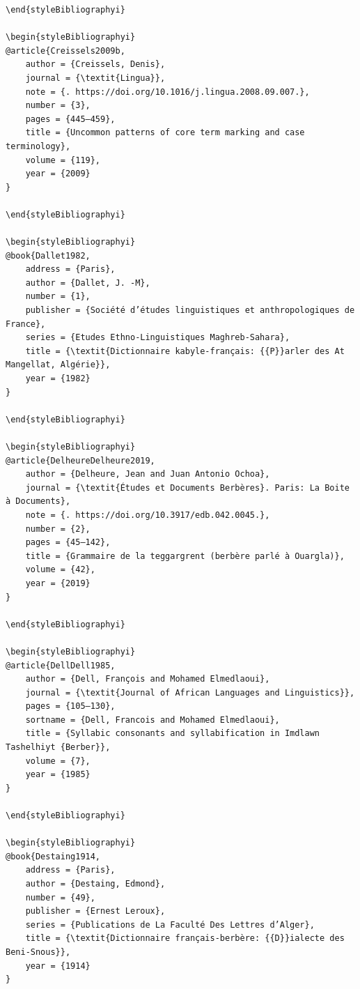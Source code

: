 \documentclass[output=paper]{langscibook}
\begin{document}
\begin{verbatim}
\end{styleBibliographyi}

\begin{styleBibliographyi}
@article{Creissels2009b,
	author = {Creissels, Denis},
	journal = {\textit{Lingua}},
	note = {. https://doi.org/10.1016/j.lingua.2008.09.007.},
	number = {3},
	pages = {445–459},
	title = {Uncommon patterns of core term marking and case terminology},
	volume = {119},
	year = {2009}
}

\end{styleBibliographyi}

\begin{styleBibliographyi}
@book{Dallet1982,
	address = {Paris},
	author = {Dallet, J. -M},
	number = {1},
	publisher = {Société d’études linguistiques et anthropologiques de France},
	series = {Etudes Ethno-Linguistiques Maghreb-Sahara},
	title = {\textit{Dictionnaire kabyle-français: {{P}}arler des At Mangellat, Algérie}},
	year = {1982}
}

\end{styleBibliographyi}

\begin{styleBibliographyi}
@article{DelheureDelheure2019,
	author = {Delheure, Jean and Juan Antonio Ochoa},
	journal = {\textit{Études et Documents Berbères}. Paris: La Boite à Documents},
	note = {. https://doi.org/10.3917/edb.042.0045.},
	number = {2},
	pages = {45–142},
	title = {Grammaire de la teggargrent (berbère parlé à Ouargla)},
	volume = {42},
	year = {2019}
}

\end{styleBibliographyi}

\begin{styleBibliographyi}
@article{DellDell1985,
	author = {Dell, François and Mohamed Elmedlaoui},
	journal = {\textit{Journal of African Languages and Linguistics}},
	pages = {105–130},
	sortname = {Dell, Francois and Mohamed Elmedlaoui},
	title = {Syllabic consonants and syllabification in Imdlawn Tashelhiyt {Berber}},
	volume = {7},
	year = {1985}
}

\end{styleBibliographyi}

\begin{styleBibliographyi}
@book{Destaing1914,
	address = {Paris},
	author = {Destaing, Edmond},
	number = {49},
	publisher = {Ernest Leroux},
	series = {Publications de La Faculté Des Lettres d’Alger},
	title = {\textit{Dictionnaire français-berbère: {{D}}ialecte des Beni-Snous}},
	year = {1914}
}


\end{verbatim}
\end{document}
